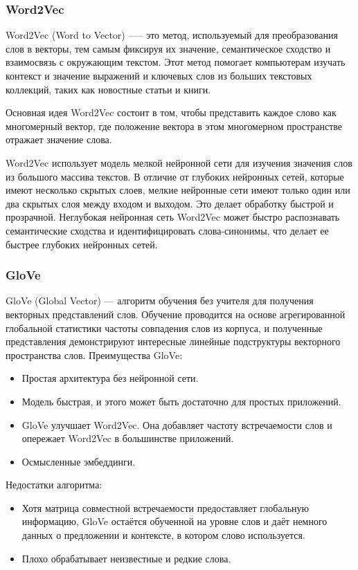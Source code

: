 \subsubsection{Word2Vec}
Word2Vec (Word to Vector) —-- это метод, используемый для преобразования слов в векторы, тем самым фиксируя их значение, семантическое сходство и взаимосвязь с окружающим текстом. Этот метод помогает компьютерам изучать контекст и значение выражений и ключевых слов из больших текстовых коллекций, таких как новостные статьи и книги.

Основная идея Word2Vec состоит в том, чтобы представить каждое слово как многомерный вектор, где положение вектора в этом многомерном пространстве отражает значение слова.

Word2Vec использует модель мелкой нейронной сети для изучения значения слов из большого массива текстов. В отличие от глубоких нейронных сетей, которые имеют несколько скрытых слоев, мелкие нейронные сети имеют только один или два скрытых слоя между входом и выходом. Это делает обработку быстрой и прозрачной. Неглубокая нейронная сеть Word2Vec может быстро распознавать семантические сходства и идентифицировать слова-синонимы, что делает ее быстрее глубоких нейронных сетей.
\subsubsection{GloVe}
GloVe (Global Vector)  --- алгоритм обучения без учителя  для получения векторных представлений слов. Обучение проводится на основе агрегированной глобальной статистики частоты совпадения слов из корпуса, и полученные представления демонстрируют интересные линейные подструктуры векторного пространства слов. Преимущества GloVe:
\begin{itemize}[label = ---]
    \item Простая архитектура без нейронной сети.
    \item Модель быстрая, и этого может быть достаточно для простых приложений.
    \item GloVe улучшает Word2Vec. Она добавляет частоту встречаемости слов и опережает Word2Vec в большинстве приложений.
    \item Осмысленные эмбеддинги.
\end{itemize}
Недостатки алгоритма:
\begin{itemize}[label = ---]
    \item Хотя матрица совместной встречаемости предоставляет глобальную информацию, GloVe остаётся обученной на уровне слов и даёт немного данных о предложении и контексте, в котором слово используется.
    \item Плохо обрабатывает неизвестные и редкие слова.
\end{itemize}

